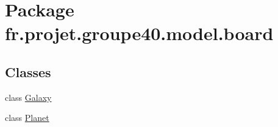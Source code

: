 \hypertarget{namespacefr_1_1projet_1_1groupe40_1_1model_1_1board}{}\section{Package fr.\+projet.\+groupe40.\+model.\+board}
\label{namespacefr_1_1projet_1_1groupe40_1_1model_1_1board}
\subsection*{Classes}
\begin{DoxyCompactItemize}
\item 
class \hyperlink{classfr_1_1projet_1_1groupe40_1_1model_1_1board_1_1_galaxy}{Galaxy}
\item 
class \hyperlink{classfr_1_1projet_1_1groupe40_1_1model_1_1board_1_1_planet}{Planet}
\end{DoxyCompactItemize}
